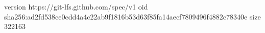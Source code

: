 version https://git-lfs.github.com/spec/v1
oid sha256:ad2fd538ce0cdd4a4c22ab9f1816b53d63f85fa14aecf7809496f4882c78340e
size 322163
